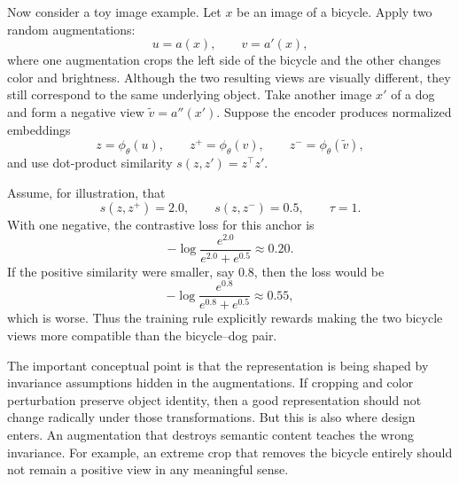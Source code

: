 Now consider a toy image example.
Let $x$ be an image of a bicycle.
Apply two random augmentations:
\[
u = a(x), \qquad v = a'(x),
\]
where one augmentation crops the left side of the bicycle and the other changes color and brightness.
Although the two resulting views are visually different, they still correspond to the same underlying object.
Take another image $x'$ of a dog and form a negative view $\tilde v = a''(x')$.
Suppose the encoder produces normalized embeddings
\[
z = \phi_\theta(u),
\qquad
z^+ = \phi_\theta(v),
\qquad
z^- = \phi_\theta(\tilde v),
\]
and use dot-product similarity $s(z,z') = z^{\top}z'$.

Assume, for illustration, that
\[
s(z,z^+) = 2.0,
\qquad
s(z,z^-) = 0.5,
\qquad
\tau = 1.
\]
With one negative, the contrastive loss for this anchor is
\[
-\log
\frac{e^{2.0}}{e^{2.0}+e^{0.5}}
\approx 0.20.
\]
If the positive similarity were smaller, say $0.8$, then the loss would be
\[
-\log
\frac{e^{0.8}}{e^{0.8}+e^{0.5}}
\approx 0.55,
\]
which is worse.
Thus the training rule explicitly rewards making the two bicycle views more compatible than the bicycle--dog pair.

The important conceptual point is that the representation is being shaped by invariance assumptions hidden in the augmentations.
If cropping and color perturbation preserve object identity, then a good representation should not change radically under those transformations.
But this is also where design enters.
An augmentation that destroys semantic content teaches the wrong invariance.
For example, an extreme crop that removes the bicycle entirely should not remain a positive view in any meaningful sense.

